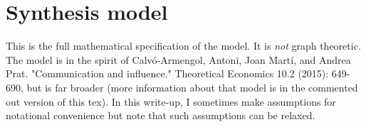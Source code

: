 \documentclass{article}
\begin{document}





\section{Synthesis model}
This is the full mathematical specification of the model.  It is
\emph{not} graph theoretic.    The model is in the
spirit of Calvó‐Armengol, Antoni, Joan Martí, and Andrea
Prat. "Communication and influence."  Theoretical Economics 10.2
(2015): 649-690, but is far broader (more information about that model
is in the commented out version of this tex).  In this write-up, I
sometimes make assumptions for notational convenience but note that
such assumptions can be relaxed.
\end{document}
